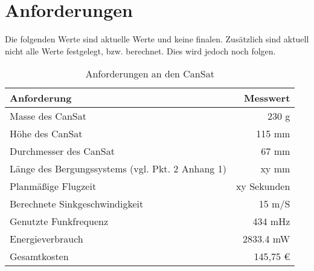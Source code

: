 \section{Anforderungen}
Die folgenden Werte sind aktuelle Werte und keine finalen. Zusätzlich sind aktuell nicht alle Werte festgelegt, bzw. berechnet. Dies wird jedoch noch folgen.
\begin{table}[htbp]
  \centering
    \begin{tabular}{l|r}
    \toprule
    \textbf{Anforderung} & \textbf{Messwert}  \\
    \midrule
    Masse des CanSat  & 230 g \\
    Höhe des CanSat	  & 115 mm\\
    Durchmesser des CanSat & 67 mm\\
	Länge des Bergungssystems (vgl. Pkt. 2 Anhang 1)  & xy mm \\
	Planmäßige Flugzeit  & xy Sekunden \\
    Berechnete Sinkgeschwindigkeit  & 15 m/S \\
    Genutzte Funkfrequenz & 434 mHz \\
    Energieverbrauch & 2833.4 mW \\
    Gesamtkosten & 145,75 \euro \\
    \bottomrule
    \end{tabular}%
    \caption{Anforderungen an den CanSat}
  \label{tab:anforderungen}%
\end{table}%